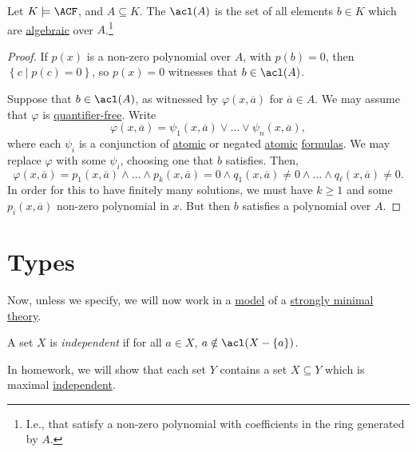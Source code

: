 \begin{theorem}
	Let \(K \models \ACF\), and \(A \subseteq K\). The \(\acl(A)\)  is the set of all elements \(b\in K\) which are \hyperref[def:algebraic]{algebraic} over \(A\).\footnote{I.e., that satisfy a non-zero polynomial with coefficients in the ring generated by \(A\).}
\end{theorem}
\begin{proof}
	If \(p(x)\) is a non-zero polynomial over \(A\), with \(p(b) = 0\), then \(\left\{ c \mid p(c) = 0 \right\} \), so \(p(x) = 0\) witnesses that \(b\in \acl(A)\).

	Suppose that \(b\in \acl(A)\), as witnessed by \(\varphi (x, \overline{a} )\) for \(\overline{a} \in A\). We may assume that \(\varphi \) is \hyperref[not:quantifier-free]{quantifier-free}. Write
	\[
		\varphi (x, \overline{a} ) = \psi _1(x, \overline{a} ) \lor \ldots \lor \psi _n(x, \overline{a} ),
	\]
	where each \(\psi _i\) is a conjunction of \hyperref[not:atomic]{atomic} or negated \hyperref[not:atomic]{atomic} \hyperref[def:formula]{formulas}. We may replace \(\varphi \) with some \(\psi _i\), choosing one that \(b\) satisfies. Then,
	\[
		\varphi (x, \overline{a} ) = p_1(x, \overline{a} ) \land \ldots \land p_k(x, \overline{a} ) = 0 \land q_1(x, \overline{a} ) \neq 0 \land \ldots \land q_{\ell}(x, \overline{a} ) \neq 0.
	\]
	In order for this to have finitely many solutions, we must have \(k \geq 1\) and some \(p_i(x, \overline{a} )\) non-zero polynomial in \(x\). But then \(b\) satisfies a polynomial over \(A\).
\end{proof}

\section{Types}
Now, unless we specify, we will now work in a \hyperref[def:model]{model} of a \hyperref[def:strongly-minimal]{strongly minimal} \hyperref[def:theory]{theory}.

\begin{definition}[Independent]\label{def:independent}
	A set \(X\) is \emph{independent} if for all \(a\in X\), \(a \notin \acl(X - \left\{ a \right\} )\).
\end{definition}

\begin{remark}
	In homework, we will show that each set \(Y\) contains a set \(X \subseteq Y\) which is maximal \hyperref[def:independent]{independent}.
\end{remark}

